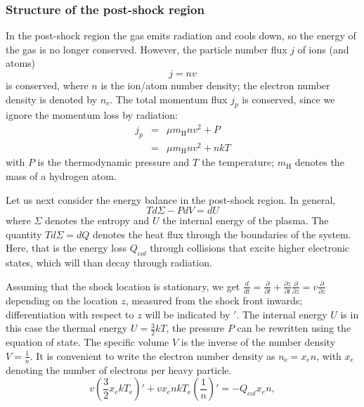 \subsubsection{Structure of the post-shock region}

In the post-shock region the gas emits radiation and cools down, so the energy of the gas is no longer conserved.  However, the particle number flux $j$ of ions (and atoms)
\begin{equation}j=nv\label{j_n}\end{equation}
is conserved, where $n$ is the ion/atom number density; the electron number density is denoted by $n_{\mathrm{e}}$. The total momentum flux $j_p$ is conserved, since we ignore the momentum loss by radiation:
\begin{eqnarray}
j_p&=&\mu m_{\mathrm{H}} n v^2+P \nonumber \\
   &=&\mu m_{\mathrm{H}} n v^2+nkT \label{j_p}
\end{eqnarray}
with $P$ is the thermodynamic pressure and $T$ the temperature; $m_{\mathrm{H}}$ denotes the mass of a hydrogen atom.

Let us next consider the energy balance in the post-shock region. In general,
\begin{equation} \label{tsminuspdvisdu} T d\Sigma -P dV=dU \end{equation}
where $\Sigma$ denotes the entropy and $U$ the internal energy of the plasma. The quantity $T d\Sigma=dQ$ denotes the heat flux through the boundaries of the system. Here, that is the energy loss $Q_{col}$ through collisions that excite higher electronic states, which will than decay through radiation.

Assuming that the shock location is stationary, we get $\frac{d}{dt}=\frac{\partial}{\partial t}+\frac{\partial z}{\partial t}\frac{\partial}{\partial z}=v\frac{\partial}{\partial z}$ depending on the location $z$, measured from the shock front inwards; differentiation with respect to $z$ will be indicated by $'$.
The internal energy $U$ is in this case the thermal energy $U=\frac{3}{2}kT$, the pressure $P$ can be rewritten using the equation of state. The specific volume $V$ is the inverse of the number density $V=\frac{1}{n}$.
It is convenient to write the electron number density as \mbox{$n_{\mathrm{e}}=x_e n$,} with $x_e$ denoting the number of electrons per heavy particle.
\begin{equation}
\label{energyelec}
v\left(\frac{3}{2}x_e k T_{\mathrm{e}}\right)'+v x_e n k T_{\mathrm{e}} \left(\frac{1}{n}\right)'=-Q_{col} x_e n,
\end{equation}

